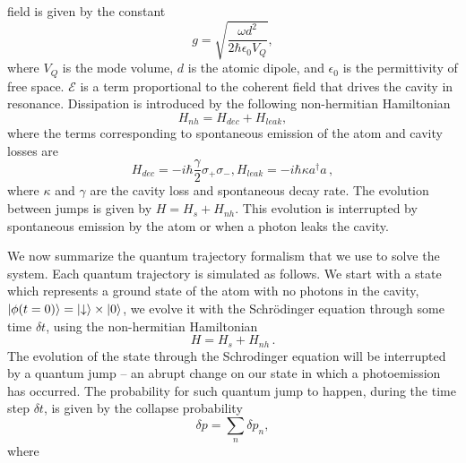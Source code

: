 \documentclass[%
 reprint,
 amsmath,amssymb,
 aps, 
]{revtex4-1}
\begin{document}
field is given by the constant
\begin{equation}
g = \sqrt{\frac{\omega d^2}{2\hbar \epsilon_0 V_Q}},
\end{equation}
where $V_Q$ is the mode volume, $d$ is the atomic dipole, and
$\epsilon_0$ is the permittivity of free space. $\mathcal{E}$ is a
term proportional to the coherent field that drives the cavity in
resonance. Dissipation is introduced by the following non-hermitian
Hamiltonian
\begin{equation} \label{nh}
H_{nh} = H_{dec} + H_{leak},
\end{equation}
where the terms corresponding to spontaneous emission of the atom and cavity losses are
\begin{subequations}
\begin{equation}
H_{dec} = - i\hbar\frac{\gamma}{2}\sigma_+\sigma_-,
\end{equation}
\begin{equation}
H_{leak} = - i\hbar\kappa a^\dagger a\, ,
\end{equation}
\end{subequations}
where $\kappa$ and $\gamma$ are the cavity loss and spontaneous decay
rate. The evolution between jumps is given by $H=H_s+H_{nh}$. This
evolution is interrupted by spontaneous emission by the atom or when a
photon leaks the cavity. 

We now summarize the quantum trajectory formalism \cite{bla} that we
use to solve the system. Each quantum trajectory is simulated as
follows. We start with a state which represents a ground state of the
atom with no photons in the cavity,
$\ket{\phi(t = 0)} = \ket{\downarrow} \times \ket{0}$, we evolve it
with the Schr\"odinger equation through some time $\delta t$, using the
non-hermitian Hamiltonian
\begin{equation}
H = H_s +H_{nh}\, .
\end{equation}
The evolution of the state through the Schrodinger equation will be
interrupted by a quantum jump – an abrupt change on our state in which
a photoemission has occurred. The probability for such quantum jump to
happen, during the time step $\delta t$, is given by the collapse
probability
\begin{equation} \label{probcol}
\delta p = \sum_n \delta p_n,
\end{equation}
where
\end{document}
